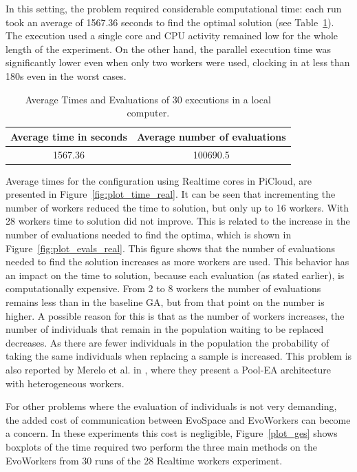 In this setting, the problem required considerable computational time: each run took an average of 1567.36 seconds to find the optimal solution (see Table~\ref{local}).
The execution used a single core and CPU activity remained low for the whole length of the experiment. On the other hand, the parallel execution time was significantly lower even when only two workers were used,
clocking in at less than 180s even in the worst cases.

\begin{table}[t]
\renewcommand{\arraystretch}{1.3}
\caption{Average Times and Evaluations of 30 executions in a local computer.}
\label{local}
\centering
\begin{tabular}{|c|c|}
\hline
Average time in seconds & Average number of evaluations \\
\hline
1567.36 & 100690.5  \\
\hline
\end{tabular}
\end{table}

Average times for the configuration using Realtime cores in PiCloud,
are presented in Figure~\ref{fig:plot_time_real}. It can be seen that
incrementing the number of workers reduced the time to solution, but only up to 16 workers. With 28 workers time to solution did not improve. This is
related to the increase in the number of evaluations needed to find
the optima, which is shown in Figure~\ref{fig:plot_evals_real}.
This figure shows that the number of evaluations needed to find the
solution increases as more workers are used. This behavior has an
impact on the time to solution, because each evaluation (as stated
earlier), is computationally expensive. From 2 to 8 workers the number
of evaluations remains less than in the baseline GA, but from that point on
the number is higher. A possible reason for this is that as
the number of workers increases, the number of individuals that remain
in the population waiting to be replaced decreases. As there are fewer
individuals in the population the probability of taking the same individuals
when replacing a sample is increased. This problem is also reported
by Merelo et al. in  \cite{sofea:naco}, where they present a Pool-EA architecture with heterogeneous workers.

For other problems where the evaluation of individuals is not very
demanding, the added cost of communication between EvoSpace and EvoWorkers can become a concern.
In these experiments this cost is negligible, Figure~\ref{plot_ges} shows boxplots of the time required two perform the
three main methods on the EvoWorkers from 30 runs of the 28 Realtime workers experiment.



